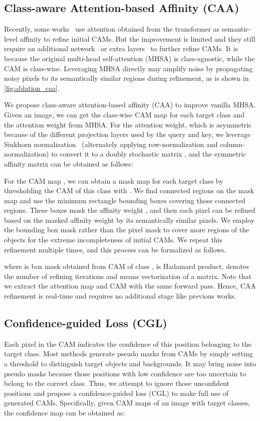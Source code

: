 \documentclass[10pt,twocolumn,letterpaper]{article}
\begin{document}
\subsection{Class-aware Attention-based Affinity (CAA)}
Recently, some works~\cite{xu2022mctformer, AFA} use attention obtained from the transformer as semantic-level affinity to refine initial CAMs. But the improvement is limited and they still require an additional network~\cite{xu2022mctformer} or extra layers~\cite{AFA} to further refine CAMs. It is because the original multi-head self-attention (MHSA) is class-agnostic, while the CAM is class-wise. Leveraging MHSA directly may amplify noise by propagating noisy pixels to its semantically similar regions during refinement, as is shown in \cref{fig:ablation_caa}. 

We propose class-aware attention-based affinity (CAA) to improve vanilla MHSA. Given an image, we can get the class-wise CAM map  for each target class  and the attention weight  from MHSA. For the attention weight, which is asymmetric because of the different projection layers used by the query and key, we leverage Sinkhorn normalization~\cite{Sinkhorn1964ARB} (alternately applying row-normalization and column-normalization) to convert it to a doubly stochastic matrix , and the symmetric affinity matrix  can be obtained as follows:

For the CAM map , we can obtain a mask map for each target class  by thresholding the CAM of this class with . We find connected regions on the mask map and use the minimum rectangle bounding boxes covering those connected regions. These boxes mask the affinity weight , and then each pixel can be refined based on the masked affinity weight by its semantically similar pixels. We employ the bounding box mask rather than the pixel mask to cover more regions of the objects for the extreme incompleteness of initial CAMs. We repeat this refinement multiple times, and this process can be formalized as follows.

where  is box mask obtained from CAM of class ,  is Hadamard product,  denotes the number of refining iterations and  means vectorization of a matrix. Note that we extract the attention map and CAM with the same forward pass. Hence, CAA refinement is real-time and requires no additional stage like previous works. 



\subsection{Confidence-guided Loss (CGL)}
Each pixel in the CAM indicates the confidence of this position belonging to the target class. Most methods generate pseudo masks from CAMs by simply setting a threshold to distinguish target objects and backgrounds. It may bring noise into pseudo masks because those positions with low confidence are too uncertain to belong to the correct class. Thus, we attempt to ignore those unconfident positions and propose a confidence-guided loss (CGL) to make full use of generated CAMs. Specifically, given CAM maps  of an image with  target classes, the confidence map can be obtained as:
\end{document}
